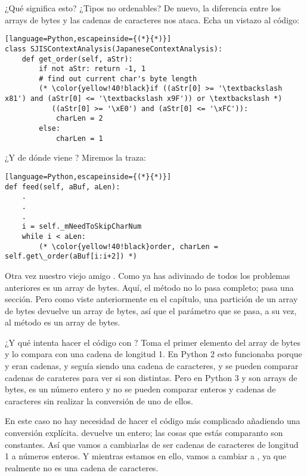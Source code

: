 ¿Qué significa esto? ¿Tipos no ordenables? De nuevo, la diferencia entre los arrays de bytes y las cadenas de caracteres nos ataca. Echa un vistazo al código:


\begin{lstlisting}[language=Python,escapeinside={(*}{*)}]
class SJISContextAnalysis(JapaneseContextAnalysis):
    def get_order(self, aStr):
        if not aStr: return -1, 1
        # find out current char's byte length
        (* \color{yellow!40!black}if ((aStr[0] >= '\textbackslash x81') and (aStr[0] <= '\textbackslash x9F')) or \textbackslash *)
           ((aStr[0] >= '\xE0') and (aStr[0] <= '\xFC')):
            charLen = 2
        else:
            charLen = 1
\end{lstlisting}

¿Y de dónde viene ? Miremos la traza:


\begin{lstlisting}[language=Python,escapeinside={(*}{*)}]
def feed(self, aBuf, aLen):
    .
    .
    .
    i = self._mNeedToSkipCharNum
    while i < aLen:
        (* \color{yellow!40!black}order, charLen = self.get\_order(aBuf[i:i+2]) *)
\end{lstlisting}

Otra vez nuestro viejo amigo . Como ya has adivinado de todos los problemas anteriores  es un array de bytes. Aquí, el método  no lo pasa completo; pasa una sección. Pero como viste anteriormente en el capítulo, una partición de un array de bytes devuelve un array de bytes, así que el parámetro  que se pasa, a su vez, al método  es un array de bytes.

¿Y qué intenta hacer el código con ? Toma el primer elemento del array de bytes y lo compara con una cadena de longitud 1. En Python 2 esto funcionaba porque  y  eran cadenas, y  seguía siendo una cadena de caracteres, y se pueden comparar cadenas de carateres para ver si son distintas. Pero en Python 3  y  son arrays de bytes,  es un número entero y no se pueden comparar enteros y cadenas de caracteres sin realizar la conversión de uno de ellos.

En este caso no hay necesidad de hacer el código más complicado añadiendo una conversión explícita.  devuelve un entero; las cosas que estás comparanto son constantes. Así que vamos a cambiarlas de ser cadenas de caracteres de longitud 1 a números enteros. Y mientras estamos en ello, vamos a cambiar  a , ya que realmente no es una cadena de caracteres.

